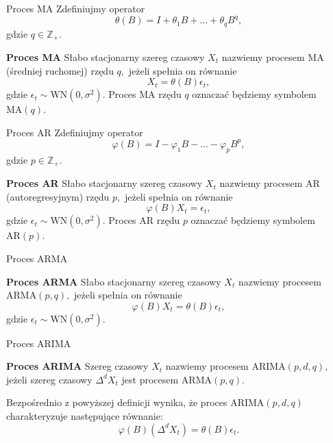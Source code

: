\documentclass[a4paper, 11pt]{beamer}
\begin{document}
	\begin{frame}{Proces MA}
		Zdefiniujmy operator \[
			\theta\left(B\right) = I + \theta_{1} B + \ldots +\theta_{q} B^{q},
		\] gdzie $q \in \mathbb{Z}_{+}.$
		\begin{block}{\textbf{Proces MA}}
			Słabo stacjonarny szereg czasowy $X_t$ nazwiemy procesem MA (średniej ruchomej) rzędu $q,$ jeżeli spełnia on równanie \[
				X_t = \theta\left(B\right) \epsilon_{t},
			\] gdzie $\epsilon_{t} \sim \mbox{WN}\left(0, \sigma^2\right).$ Proces MA rzędu $q$ oznaczać będziemy symbolem $\mbox{MA}\left(q\right)$.
		\end{block}
	\end{frame}
	
	\begin{frame}{Proces AR}
		Zdefiniujmy operator \[
			\varphi\left(B\right) = I - \varphi_{1} B - \ldots - \varphi_{p} B^{p},
		\] gdzie $p \in \mathbb{Z}_{+}.$
		\begin{block}{\textbf{Proces AR}}
			Słabo stacjonarny szereg czasowy $X_t$ nazwiemy procesem AR (autoregresyjnym) rzędu $p,$ jeżeli spełnia on równanie \[
				\varphi\left(B\right) X_t = \epsilon_{t},
			\] gdzie $\epsilon_{t} \sim \mbox{WN}\left(0, \sigma^2\right).$ Proces AR rzędu $p$ oznaczać będziemy symbolem $\mbox{AR}\left(p\right)$.
		\end{block}
	\end{frame}
	
	\begin{frame}{Proces ARMA}
		\begin{block}{\textbf{Proces ARMA}}
			Słabo stacjonarny szereg czasowy $X_t$ nazwiemy procesem $\mbox{ARMA}\left(p, q\right),$ jeżeli spełnia on równanie \[
				\varphi\left(B\right) X_t = \theta\left(B\right) \epsilon_{t},
			\] gdzie $\epsilon_{t} \sim \mbox{WN}\left(0, \sigma^2\right).$
		\end{block}
	\end{frame}
	
	\begin{frame}{Proces ARIMA}
		\begin{block}{\textbf{Proces ARIMA}}
			Szereg czasowy $X_t$ nazwiemy procesem $\mbox{ARIMA}\left(p, d, q\right),$ jeżeli
			szereg czasowy $\Delta^{d} X_t$ jest procesem $\mbox{ARMA}\left(p, q\right).$
		\end{block}
		Bezpośrednio z powyższej definicji wynika, że proces $\mbox{ARIMA}\left(p, d, q\right)$ charakteryzuje następujące równanie: \[
			\varphi\left(B\right)\left(\Delta^{d} X_{t}\right) = \theta\left(B\right) \epsilon_{t}.
		\]
	\end{frame}
	
\end{document}
